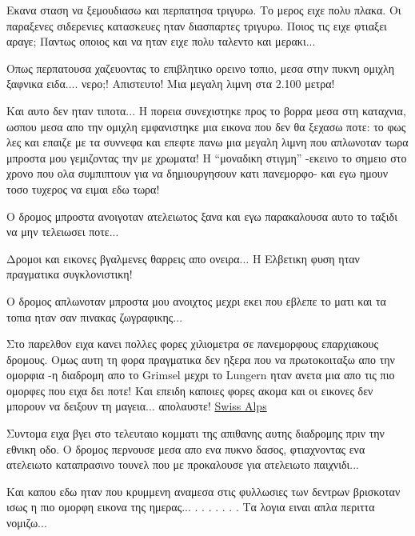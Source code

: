 
Εκανα σταση να ξεμουδιασω και περπατησα τριγυρω. Το μερος ειχε πολυ πλακα. Οι παραξενες σιδερενιες κατασκευες ηταν διασπαρτες τριγυρω. Ποιος τις ειχε φτιαξει αραγε; Παντως οποιος και να ηταν ειχε πολυ ταλεντο και μερακι...

Οπως περπατουσα χαζευοντας το επιβλητικο ορεινο τοπιο, μεσα στην πυκνη ομιχλη ξαφνικα ειδα.... νερο;! Απιστευτο! Μια μεγαλη λιμνη στα 2.100 μετρα! 


Και αυτο δεν ηταν τιποτα...
Η πορεια συνεχιστηκε προς το βορρα μεσα στη καταχνια, ωσπου μεσα απο την ομιχλη εμφανιστηκε μια εικονα που δεν θα ξεχασω ποτε: το φως λες και επαιζε με τα συννεφα και επεφτε πανω μια μεγαλη λιμνη που απλωνοταν τωρα μπροστα μου γεμιζοντας την με χρωματα! 
Η ``μοναδικη στιγμη'' -εκεινο το σημειο στο χρονο που ολα συμπιπτουν για να δημιουργησουν κατι πανεμορφο- και εγω ημουν τοσο τυχερος να ειμαι εδω τωρα!


Ο δρομος μπροστα ανοιγοταν ατελειωτος ξανα και εγω παρακαλουσα αυτο το ταξιδι να μην τελειωσει ποτε...


Δρομοι και εικονες βγαλμενες θαρρεις απο ονειρα... Η Ελβετικη φυση ηταν πραγματικα συγκλονιστικη!


Ο δρομος απλωνοταν μπροστα μου ανοιχτος μεχρι εκει που εβλεπε το ματι και τα τοπια ηταν σαν πινακας ζωγραφικης...


Στο παρελθον ειχα κανει πολλες φορες χιλιομετρα σε πανεμορφους επαρχιακους δρομους. Ομως αυτη τη φορα πραγματικα δεν ηξερα που να πρωτοκοιταξω απο την ομορφια -η διαδρομη απο το Grimsel μεχρι το Lungern ηταν ανετα μια απο τις πιο ομορφες που ειχα δει ποτε! Και επειδη καποιες φορες ακομα και οι εικονες δεν μπορουν να δειξουν τη μαγεια... απολαυστε! \href{http://www.youtube.com/watch?v=UuPvab4E5ZI}{Swiss Alps}

Συντομα ειχα βγει στο τελευταιο κομματι της απιθανης αυτης διαδρομης πριν την εθνικη οδο.
Ο δρομος περνουσε μεσα απο ενα πυκνο δασος, φτιαχνοντας ενα ατελειωτο καταπρασινο τουνελ που με προκαλουσε για ατελειωτο παιχνιδι... 


Και καπου εδω ηταν που κρυμμενη αναμεσα στις φυλλωσιες των δεντρων βρισκοταν ισως η πιο ομορφη εικονα της ημερας...
.
.
.
.
.
.
.
Τα λογια ειναι απλα περιττα νομιζω...

